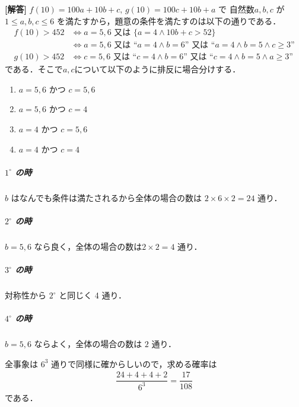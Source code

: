 \documentclass[../../main.tex]{subfiles}
\begin{document}
\begin{oframed}
  
\end{oframed}

{\bf [解答]}
$f(10) = 100a + 10b + c, \, g(10) = 100c + 10b + a$ で 自然数$a,b,c$ が $1 \le a,b,c \le 6$ を満たすから，題意の条件を満たすのは以下の通りである．
\begin{align}
  f(10) > 452 &\iff a=5,6 \text{ 又は } \{a=4 \land 10b+c > 52\} \\
  &\iff a=5,6 \text{ 又は } \text{“}a=4 \land b=6\text{”} \text{ 又は } \text{“}a=4 \land b=5 \land c \ge 3\text{”} \\
  g(10) > 452 &\iff c=5,6 \text{ 又は } \text{“}c=4 \land b=6\text{”} \text{ 又は } \text{“}c=4 \land b=5 \land a \ge 3\text{”}
\end{align}
である．そこで$a,c$について以下のように排反に場合分けする．
\begin{enumerate}
  \item[$1^\circ$] $a=5,6$ かつ $c=5,6$
  \item[$2^\circ$] $a=5,6$ かつ $c=4$
  \item[$3^\circ$] $a=4$ かつ $c=5,6$
  \item[$4^\circ$] $a=4$ かつ $c=4$
\end{enumerate}

\subparagraph{$1^\circ$ の時}

$b$ はなんでも条件は満たされるから全体の場合の数は $2 \times 6 \times 2 = 24$ 通り．

\subparagraph{$2^\circ$ の時}

$b=5,6$ なら良く，全体の場合の数は$2 \times 2 = 4$ 通り．

\subparagraph{$3^\circ$ の時}
対称性から $2^\circ$ と同じく 4 通り．

\subparagraph{$4^\circ$ の時}
$b=5,6$ ならよく，全体の場合の数は $2$ 通り．
\casesend

全事象は $6^3$ 通りで同様に確からしいので，求める確率は
\begin{align}
  \dfrac{24 + 4 + 4 + 2}{6^3} = \dfrac{17}{108}
\end{align}
である．
\end{document}
